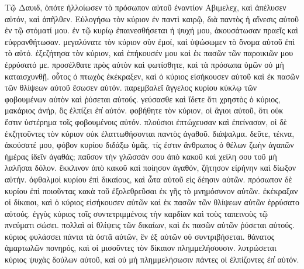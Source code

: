 \pagebreak



Τῷ
Δαυιδ,
ὁπότε
ἠλλοίωσεν
τὸ
πρόσωπον
αὐτοῦ
ἐναντίον
Αβιμελεχ,
καὶ
ἀπέλυσεν
αὐτόν,
καὶ
ἀπῆλθεν.
Εὐλογήσω
τὸν
κύριον
ἐν
παντὶ
καιρῷ,
διὰ
παντὸς
ἡ
αἴνεσις
αὐτοῦ
ἐν
τῷ
στόματί
μου.
ἐν
τῷ
κυρίῳ
ἐπαινεσθήσεται
ἡ
ψυχή
μου,
ἀκουσάτωσαν
πραεῖς
καὶ
εὐφρανθήτωσαν.
μεγαλύνατε
τὸν
κύριον
σὺν
ἐμοί,
καὶ
ὑψώσωμεν
τὸ
ὄνομα
αὐτοῦ
ἐπὶ
τὸ
αὐτό.
ἐξεζήτησα
τὸν
κύριον,
καὶ
ἐπήκουσέν
μου
καὶ
ἐκ
πασῶν
τῶν
παροικιῶν
μου
ἐρρύσατό
με.
προσέλθατε
πρὸς
αὐτὸν
καὶ
φωτίσθητε,
καὶ
τὰ
πρόσωπα
ὑμῶν
οὐ
μὴ
καταισχυνθῇ.
οὗτος
ὁ
πτωχὸς
ἐκέκραξεν,
καὶ
ὁ
κύριος
εἰσήκουσεν
αὐτοῦ
καὶ
ἐκ
πασῶν
τῶν
θλίψεων
αὐτοῦ
ἔσωσεν
αὐτόν.
παρεμβαλεῖ
ἄγγελος
κυρίου
κύκλῳ
τῶν
φοβουμένων
αὐτὸν
καὶ
ῥύσεται
αὐτούς.
γεύσασθε
καὶ
ἴδετε
ὅτι
χρηστὸς
ὁ
κύριος,
μακάριος
ἀνήρ,
ὃς
ἐλπίζει
ἐπ̓
αὐτόν.
φοβήθητε
τὸν
κύριον,
οἱ
ἅγιοι
αὐτοῦ,
ὅτι
οὐκ
ἔστιν
ὑστέρημα
τοῖς
φοβουμένοις
αὐτόν.
πλούσιοι
ἐπτώχευσαν
καὶ
ἐπείνασαν,
οἱ
δὲ
ἐκζητοῦντες
τὸν
κύριον
οὐκ
ἐλαττωθήσονται
παντὸς
ἀγαθοῦ.
διάψαλμα.
δεῦτε,
τέκνα,
ἀκούσατέ
μου,
φόβον
κυρίου
διδάξω
ὑμᾶς.
τίς
ἐστιν
ἄνθρωπος
ὁ
θέλων
ζωὴν
ἀγαπῶν
ἡμέρας
ἰδεῖν
ἀγαθάς;
παῦσον
τὴν
γλῶσσάν
σου
ἀπὸ
κακοῦ
καὶ
χείλη
σου
τοῦ
μὴ
λαλῆσαι
δόλον.
ἔκκλινον
ἀπὸ
κακοῦ
καὶ
ποίησον
ἀγαθόν,
ζήτησον
εἰρήνην
καὶ
δίωξον
αὐτήν.
ὀφθαλμοὶ
κυρίου
ἐπὶ
δικαίους,
καὶ
ὦτα
αὐτοῦ
εἰς
δέησιν
αὐτῶν.
πρόσωπον
δὲ
κυρίου
ἐπὶ
ποιοῦντας
κακὰ
τοῦ
ἐξολεθρεῦσαι
ἐκ
γῆς
τὸ
μνημόσυνον
αὐτῶν.
ἐκέκραξαν
οἱ
δίκαιοι,
καὶ
ὁ
κύριος
εἰσήκουσεν
αὐτῶν
καὶ
ἐκ
πασῶν
τῶν
θλίψεων
αὐτῶν
ἐρρύσατο
αὐτούς.
ἐγγὺς
κύριος
τοῖς
συντετριμμένοις
τὴν
καρδίαν
καὶ
τοὺς
ταπεινοὺς
τῷ
πνεύματι
σώσει.
πολλαὶ
αἱ
θλίψεις
τῶν
δικαίων,
καὶ
ἐκ
πασῶν
αὐτῶν
ῥύσεται
αὐτούς.
κύριος
φυλάσσει
πάντα
τὰ
ὀστᾶ
αὐτῶν,
ἓν
ἐξ
αὐτῶν
οὐ
συντριβήσεται.
θάνατος
ἁμαρτωλῶν
πονηρός,
καὶ
οἱ
μισοῦντες
τὸν
δίκαιον
πλημμελήσουσιν.
λυτρώσεται
κύριος
ψυχὰς
δούλων
αὐτοῦ,
καὶ
οὐ
μὴ
πλημμελήσωσιν
πάντες
οἱ
ἐλπίζοντες
ἐπ̓
αὐτόν. 